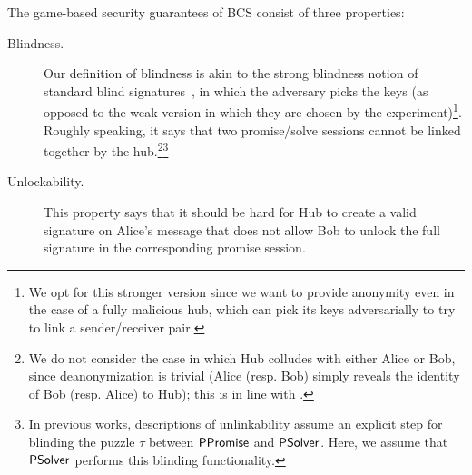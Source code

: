 The game-based security guarantees of BCS consist of three properties:
\begin{description}
    \item[Blindness.] Our definition of blindness is akin to the strong blindness notion of standard blind signatures~\cite{C:Chaum82}, in which the adversary picks the keys (as opposed to the weak version in which they are chosen by the experiment)\footnote{We opt for this stronger version since we want to provide anonymity even in the case of a fully malicious hub, which can pick its keys adversarially to try to link a sender/receiver pair.}. Roughly speaking, it says that two promise/solve sessions cannot be linked together by the hub.\footnote{We do not consider the case in which Hub colludes with either Alice or Bob, since deanonymization is trivial (Alice (resp. Bob) simply reveals the identity of Bob (resp. Alice) to Hub); this is in line with \cite{SP:TaiMorMaf21}.}\footnote{In previous works, descriptions of unlinkability assume an explicit step for blinding the puzzle $\tau$ between $\mathsf{PPromise}$ and $\mathsf{PSolver}$. Here, we assume that $\mathsf{PSolver}$ performs this blinding functionality.}
    \item[Unlockability.] This property says that it should be hard for Hub to create a valid signature on Alice's message that does not allow Bob to unlock the full signature in the corresponding promise session.

\end{description}
